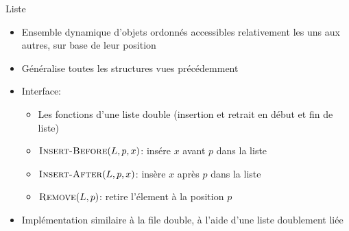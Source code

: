 \begin{frame}{Liste}

\begin{itemize}
\item Ensemble dynamique d'objets ordonnés accessibles \alert{relativement}
  les uns aux autres, sur base de leur position
\item Généralise toutes les structures vues précédemment
\item Interface:
\begin{itemize}
\item Les fonctions d'une liste double (insertion et retrait en début et fin de liste)
\item $\textnormal{\scshape Insert-Before}(L,p,x)$: insére $x$ avant $p$ dans la liste
\item $\textnormal{\scshape Insert-After}(L,p,x)$: insère $x$ après $p$ dans la liste
\item $\textnormal{\scshape Remove}(L,p)$: retire l'élement à la position $p$
\end{itemize}

\bigskip

\item Implémentation similaire à la file double, à l'aide d'une liste doublement liée
\end{itemize}

\end{frame}

